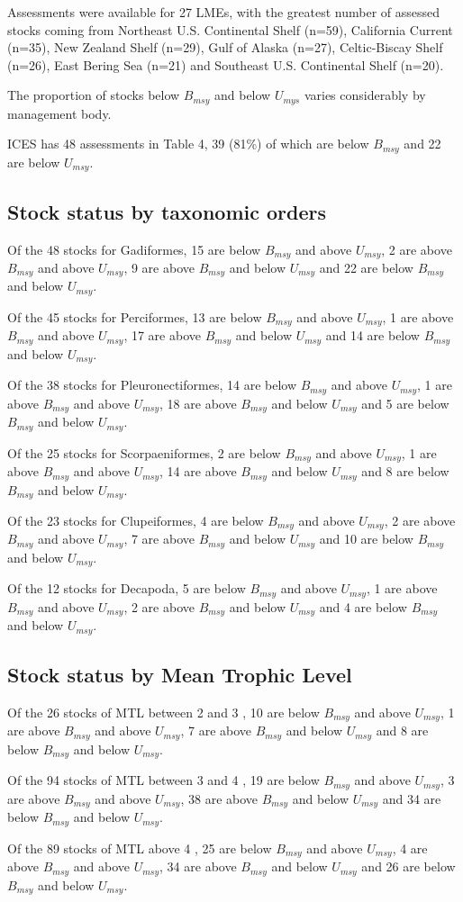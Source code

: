 Assessments were available for 27 LMEs, with the greatest number of
assessed stocks coming from Northeast U.S. Continental Shelf (n=59),
California Current (n=35), New Zealand Shelf (n=29),
Gulf of Alaska (n=27), Celtic-Biscay Shelf (n=26), East Bering Sea (n=21)
and Southeast U.S. Continental Shelf (n=20).

The proportion of stocks below $B_{msy}$ and below $U_{mys}$ varies considerably by management body. 

ICES has 48 assessments in Table 4,
39
(81\%) of which are below
$B_{msy}$ and 22 are below
$U_{msy}$.

\subsection*{Stock status by taxonomic orders}

Of the 48 stocks for Gadiformes, 15 are below $B_{msy}$ and above $U_{msy}$, 2 are above $B_{msy}$ and above $U_{msy}$, 9 are above $B_{msy}$ and below $U_{msy}$ and 22 are below $B_{msy}$ and below $U_{msy}$.

Of the 45 stocks for Perciformes, 13 are below $B_{msy}$ and above $U_{msy}$, 1 are above $B_{msy}$ and above $U_{msy}$, 17 are above $B_{msy}$ and below $U_{msy}$ and 14 are below $B_{msy}$ and below $U_{msy}$.

Of the 38 stocks for Pleuronectiformes, 14 are below $B_{msy}$ and above $U_{msy}$, 1 are above $B_{msy}$ and above $U_{msy}$, 18 are above $B_{msy}$ and below $U_{msy}$ and 5 are below $B_{msy}$ and below $U_{msy}$.

Of the 25 stocks for Scorpaeniformes, 2 are below $B_{msy}$ and above $U_{msy}$, 1 are above $B_{msy}$ and above $U_{msy}$, 14 are above $B_{msy}$ and below $U_{msy}$ and 8 are below $B_{msy}$ and below $U_{msy}$.

Of the 23 stocks for Clupeiformes, 4 are below $B_{msy}$ and above $U_{msy}$, 2 are above $B_{msy}$ and above $U_{msy}$, 7 are above $B_{msy}$ and below $U_{msy}$ and 10 are below $B_{msy}$ and below $U_{msy}$.

Of the 12 stocks for Decapoda, 5 are below $B_{msy}$ and above $U_{msy}$, 1 are above $B_{msy}$ and above $U_{msy}$, 2 are above $B_{msy}$ and below $U_{msy}$ and 4 are below $B_{msy}$ and below $U_{msy}$.


\subsection*{Stock status by Mean Trophic Level}
Of the 26 stocks of MTL between 2 and 3 , 10 are below $B_{msy}$ and above $U_{msy}$, 1 are above $B_{msy}$ and above $U_{msy}$, 7 are above $B_{msy}$ and below $U_{msy}$ and 8 are below $B_{msy}$ and below $U_{msy}$.

Of the 94 stocks of MTL between 3 and 4 , 19 are below $B_{msy}$ and above $U_{msy}$, 3 are above $B_{msy}$ and above $U_{msy}$, 38 are above $B_{msy}$ and below $U_{msy}$ and 34 are below $B_{msy}$ and below $U_{msy}$.

Of the 89 stocks of MTL above 4 , 25 are below $B_{msy}$ and above $U_{msy}$, 4 are above $B_{msy}$ and above $U_{msy}$, 34 are above $B_{msy}$ and below $U_{msy}$ and 26 are below $B_{msy}$ and below $U_{msy}$.

